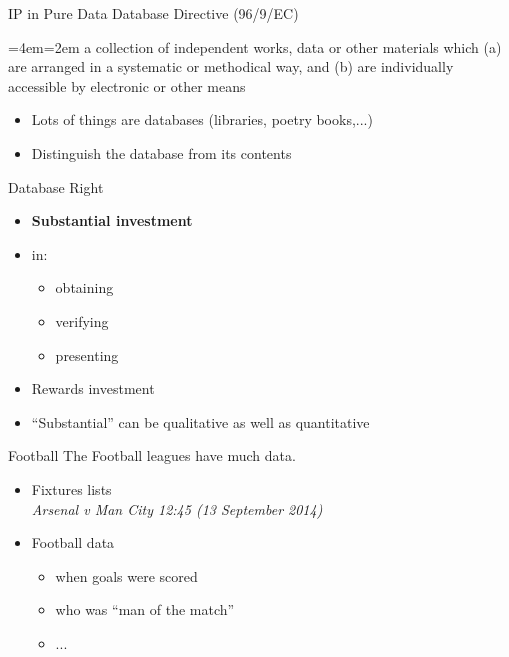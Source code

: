 \documentclass{beamer}
\newenvironment{blockquote}{%
  \par%
  \medskip
  \leftskip=4em\rightskip=2em%
  \noindent\ignorespaces}{%
  \par\medskip}
\begin{document}
\begin{frame}{IP in Pure Data}
  Database Directive (96/9/EC)
  \begin{blockquote}
    a collection of independent works, data or other materials which (a)
are arranged in a systematic or methodical way, and (b) are individually
accessible by electronic or other means
  \end{blockquote}
  \begin{itemize}
  \item Lots of things are databases (libraries, poetry books,...)
  \item Distinguish the database from its contents
  \end{itemize}
\end{frame}

\begin{frame}{Database Right}
  \begin{itemize}
  \item {\bf Substantial investment}
  \item in:
    \begin{itemize}
    \item obtaining
    \item verifying
    \item presenting
    \end{itemize}
  \item Rewards investment
  \item ``Substantial'' can be qualitative as well as quantitative
  \end{itemize}
  
\end{frame}

\begin{frame}{Football}
The Football leagues have much data.
  \begin{itemize}
  \item Fixtures lists \\
    {\it  Arsenal v Man City 12:45 (13 September 2014) }

\item Football data
  \begin{itemize}
  \item when goals were scored
  \item who was ``man of the match''
  \item ...
  \end{itemize}
  \end{itemize}
\end{frame}
\end{document}

